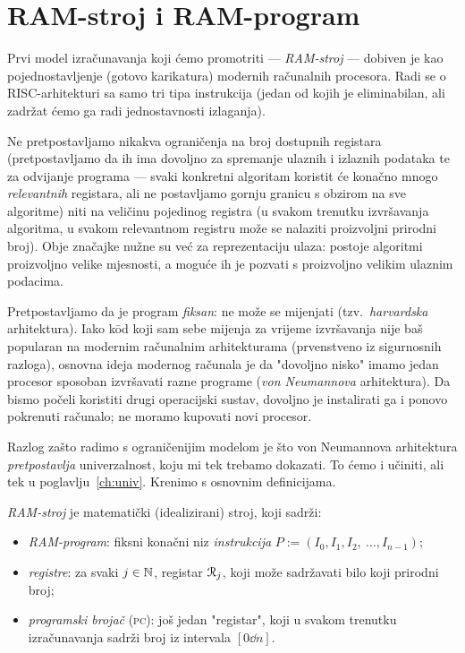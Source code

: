 \section{RAM-stroj i RAM-program}\label{sec:RAMizr}

Prvi model izračunavanja koji ćemo promotriti --- \emph{RAM-stroj} --- dobiven je kao pojednostavljenje (gotovo karikatura) modernih računalnih procesora. Radi se o RISC-arhitekturi sa samo tri tipa instrukcija (jedan od kojih je eliminabilan, ali zadržat ćemo ga radi jednostavnosti izlaganja).

Ne pretpostavljamo nikakva ograničenja na broj dostupnih registara (pretpostavljamo da ih ima dovoljno za spremanje ulaznih i izlaznih podataka te za odvijanje programa --- svaki konkretni algoritam koristit će konačno mnogo \emph{relevantnih} registara, ali ne postavljamo gornju granicu s obzirom na sve algoritme) niti na veličinu pojedinog registra (u svakom trenutku izvršavanja algoritma, u svakom relevantnom registru može se nalaziti proizvoljni prirodni broj). Obje značajke nužne su već za reprezentaciju ulaza: postoje algoritmi proizvoljno velike mjesnosti, a moguće ih je pozvati s proizvoljno velikim ulaznim podacima.

Pretpostavljamo da je program \emph{fiksan}: ne može se mijenjati (tzv\!.\ \emph{harvardska} arhitektura). Iako k\=od koji sam sebe mijenja za vrijeme izvršavanja nije baš popularan na modernim računalnim arhitekturama (prvenstveno iz sigurnosnih razloga), osnovna ideja modernog računala je da "dovoljno nisko" imamo jedan procesor sposoban izvršavati razne programe (\emph{von Neumannova} arhitektura). Da bismo počeli koristiti drugi operacijski sustav\!, dovoljno je instalirati ga i ponovo pokrenuti računalo; ne moramo kupovati novi procesor.

Razlog zašto radimo s ograničenijim modelom je što von Neumannova arhitektura \emph{pretpostavlja} univerzalnost, koju mi tek trebamo dokazati. To ćemo i učiniti, ali tek u poglavlju~\ref{ch:univ}. Krenimo s osnovnim definicijama.


\begin{definicija}[{name=[RAM-stroj]}]
\emph{RAM-stroj} je matematički (idealizirani) stroj, koji sadrži:
\begin{itemize}
    \item \emph{RAM-program}: fiksni konačni niz \emph{instrukcija} $P:=(I_0,I_1,I_2,~\dotsc, I_{n-1})$;
    \item \emph{registre}: za svaki $j\in{\mathbb N}$, registar $\mathcal R_{j}$, koji može sadržavati bilo koji prirodni broj;
    \item \emph{programski brojač} (\textsc{pc}): još jedan "registar", koji u svakom trenutku iz\-ra\-ču\-na\-va\-nja sadrži broj iz intervala $[0\dd n]$.
    \qedhere
\end{itemize}
\end{definicija}


